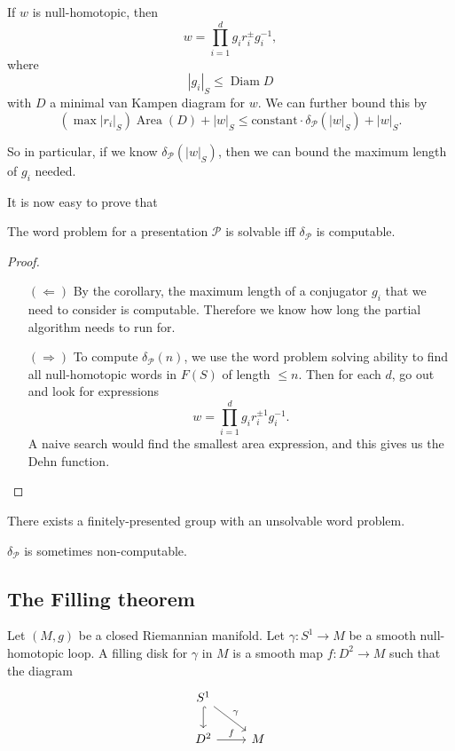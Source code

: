 \documentclass[a4paper]{article}
\DeclareMathOperator\Area{Area}
\DeclareMathOperator\Diam{Diam}
\begin{document}
\begin{cor}
  If $w$ is null-homotopic, then
  \[
    w = \prod_{i = 1}^d g_i r_i^{\pm} g_i^{-1},
  \]
  where
  \[
    |g_i|_S \leq \Diam D
  \]
  with $D$ a minimal van Kampen diagram for $w$. We can further bound this by
  \[
    (\max |r_i|_S) \Area(D) + |w|_S \leq \text{constant} \cdot \delta_{\mathcal{P}}(|w|_S) + |w|_S.
  \]
\end{cor}
So in particular, if we know $\delta_{\mathcal{P}}(|w|_S)$, then we can bound the maximum length of $g_i$ needed.

It is now easy to prove that
\begin{prop}
  The word problem for a presentation $\mathcal{P}$ is solvable iff $\delta_{\mathcal{P}}$ is computable.
\end{prop}

\begin{proof}\leavevmode
  \begin{itemize}
    \item[$(\Leftarrow)$] By the corollary, the maximum length of a conjugator $g_i$ that we need to consider is computable. Therefore we know how long the partial algorithm needs to run for.
    \item[$(\Rightarrow)$] To compute $\delta_{\mathcal{P}}(n)$, we use the word problem solving ability to find all null-homotopic words in $F(S)$ of length $\leq n$. Then for each $d$, go out and look for expressions
      \[
        w = \prod_{i = 1}^d g_i r_i^{\pm 1} g_i^{-1}.
      \]
      A naive search would find the smallest area expression, and this gives us the Dehn function.
  \end{itemize}
\end{proof}

\begin{thm}
  There exists a finitely-presented group with an unsolvable word problem.
\end{thm}

\begin{cor}
  $\delta_{\mathcal{P}}$ is sometimes non-computable.
\end{cor}

\subsection{The Filling theorem}
\begin{defi}
  Let $(M, g)$ be a closed Riemannian manifold. Let $\gamma: S^1 \to M$ be a smooth null-homotopic loop. A filling disk for $\gamma$ in $M$ is a smooth map $f: D^2 \to M$ such that the diagram
  \[
    \begin{tikzcd}
      S^1 \ar[d, hook] \ar[rd, "\gamma"] \\
      D^2 \ar[r, "f"] & M
    \end{tikzcd}
  \]
\end{defi}
\end{document}
